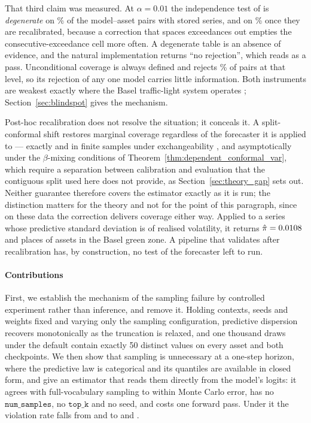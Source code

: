 \documentclass[preprint,11pt,authoryear]{elsarticle}
\newcommand{\1}{\boldsymbol{1}}
\begin{document}
That third claim was measured. At $\alpha = 0.01$ the independence test of
\citet{christoffersen1998} is \emph{degenerate} on \nSeqCCUndefRawOne\% of the
\nSeqPairs{} model--asset pairs with stored series, and on \nSeqCCUndefCorOne\%
once they are recalibrated, because a correction that spaces exceedances out
empties the consecutive-exceedance cell more often. A degenerate table is an
absence of evidence, and the natural implementation returns ``no rejection'',
which reads as a pass. Unconditional coverage \citep{kupiec1995} is always
defined and rejects \nSeqKupiecRejRawOne\% of pairs at that level, so its
rejection of any one model carries little information. Both instruments are
weakest exactly where the Basel traffic-light system operates
\citep{basel1996}; Section~\ref{sec:blindspot} gives the mechanism.

Post-hoc recalibration does not resolve the situation; it conceals it. A
split-conformal shift restores marginal coverage regardless of the forecaster it
is applied to --- exactly and in finite samples under exchangeability
\citep{vovk2005algorithmic,lei2018distribution}, and asymptotically under the
$\beta$-mixing conditions of Theorem~\ref{thm:dependent_conformal_var}, which
require a separation between calibration and evaluation that the contiguous split
used here does not provide, as Section~\ref{sec:theory_gap} sets out. Neither
guarantee therefore covers the estimator exactly as it is run; the distinction
matters for the theory and not for the point of this paragraph, since on these
data the correction delivers coverage either way. Applied to a series whose predictive
standard deviation is \nDispDefaultSmall{} of realised volatility, it returns
$\hat\pi = 0.0108$ and places \nTruncCorGreen{} of \nMainAssets{} assets in
the Basel green zone. A pipeline that validates after recalibration has,
by construction, no test of the forecaster left to run.

\paragraph{Contributions} First, we establish the mechanism of the sampling
failure by controlled experiment rather than inference, and remove it. Holding
contexts, seeds and weights fixed and varying only the sampling configuration,
predictive dispersion recovers monotonically as the truncation is relaxed, and
one thousand draws under the default contain exactly 50 distinct values on every
asset and both checkpoints. We then show that sampling is unnecessary at a
one-step horizon, where the predictive law is categorical and its quantiles are
available in closed form, and give an estimator that reads them directly from the
model's logits: it agrees with full-vocabulary sampling to within Monte Carlo
error, has no $\texttt{num\_samples}$, no $\texttt{top\_k}$ and no seed, and
costs one forward pass. Under it the violation rate falls from
\nPiSmallDefaultOne{} and \nPiMiniDefaultOne{} to \nPiSmallAnalyticOne{} and
\nPiMiniAnalyticOne.
\end{document}
